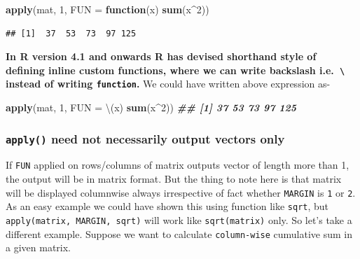 \documentclass[
]{book}
\newenvironment{Shaded}{\begin{snugshade}}{\end{snugshade}}
\newcommand{\AttributeTok}[1]{\textcolor[rgb]{0.13,0.29,0.53}{#1}}
\newcommand{\ControlFlowTok}[1]{\textcolor[rgb]{0.13,0.29,0.53}{\textbf{#1}}}
\newcommand{\DecValTok}[1]{\textcolor[rgb]{0.00,0.00,0.81}{#1}}
\newcommand{\DocumentationTok}[1]{\textcolor[rgb]{0.56,0.35,0.01}{\textbf{\textit{#1}}}}
\newcommand{\FunctionTok}[1]{\textcolor[rgb]{0.13,0.29,0.53}{\textbf{#1}}}
\newcommand{\NormalTok}[1]{#1}
\newcommand{\SpecialCharTok}[1]{\textcolor[rgb]{0.81,0.36,0.00}{\textbf{#1}}}
\begin{document}
\begin{Shaded}
\begin{Highlighting}[]
\FunctionTok{apply}\NormalTok{(mat, }\DecValTok{1}\NormalTok{, }\AttributeTok{FUN =} \ControlFlowTok{function}\NormalTok{(x) }\FunctionTok{sum}\NormalTok{(x}\SpecialCharTok{\^{}}\DecValTok{2}\NormalTok{))}
\end{Highlighting}
\end{Shaded}

\begin{verbatim}
## [1]  37  53  73  97 125
\end{verbatim}

\textbf{In R version 4.1 and onwards R has devised shorthand style of defining inline custom functions, where we can write backslash i.e.~\texttt{\textbackslash{}} instead of writing \texttt{function}.} We could have written above expression as-

\begin{Shaded}
\begin{Highlighting}[]
\FunctionTok{apply}\NormalTok{(mat, }\DecValTok{1}\NormalTok{, }\AttributeTok{FUN =}\NormalTok{ \textbackslash{}(x) }\FunctionTok{sum}\NormalTok{(x}\SpecialCharTok{\^{}}\DecValTok{2}\NormalTok{))}
\DocumentationTok{\#\# [1]  37  53  73  97 125}
\end{Highlighting}
\end{Shaded}

\hypertarget{apply-need-not-necessarily-output-vectors-only}{%
\subsubsection*{\texorpdfstring{\texttt{apply()} need not necessarily output vectors only}{apply() need not necessarily output vectors only}}\label{apply-need-not-necessarily-output-vectors-only}}

If \texttt{FUN} applied on rows/columns of matrix outputs vector of length more than 1, the output will be in matrix format. But the thing to note here is that matrix will be displayed columnwise always irrespective of fact whether \texttt{MARGIN} is \texttt{1} or \texttt{2}. As an easy example we could have shown this using function like \texttt{sqrt}, but \texttt{apply(matrix,\ MARGIN,\ sqrt)} will work like \texttt{sqrt(matrix)} only. So let's take a different example. Suppose we want to calculate \texttt{column-wise} cumulative sum in a given matrix.
\end{document}
